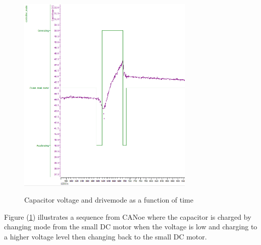 \begin{figure}[H]
    \centering\label{fig:elba_capvoltage_regen}
    \includegraphics[width=0.75\textwidth]{./img/elba_capvoltage_regen}
    \caption{Capacitor voltage and drivemode as a function of time}
\end{figure}

Figure (\ref{fig:elba_capvoltage_regen}) illustrates a sequence from CANoe where the capacitor is charged by changing mode from the small DC motor when the voltage is low and charging to a higher voltage level then changing back to the small DC motor.

